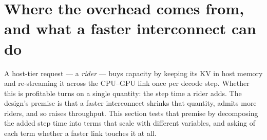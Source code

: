 %
%
%
%
%
%
%
\section{Where the overhead comes from, and what a faster interconnect can do}
\label{sec:overhead}

A host-tier request --- a \emph{rider} --- buys capacity by keeping its KV in
host memory and re-streaming it across the CPU--GPU link once per decode step.
Whether this is profitable turns on a single quantity: the step time a rider
adds. The design's premise is that a faster interconnect shrinks that quantity,
admits more riders, and so raises throughput. This section tests that premise by
decomposing the added step time into terms that scale with different variables,
and asking of each term whether a faster link touches it at all.

